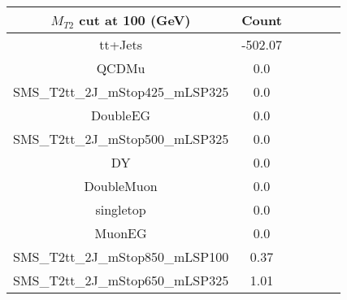 \documentclass[8pt]{article}
\begin{document}
\begin{tabular}{|c|c|c|c|c|c|}
\hline
$M_{T2}$ cut at 100 (GeV) & Count \\
\hline
\hline
tt+Jets & -502.07\\
QCDMu & 0.0\\
SMS\_T2tt\_2J\_mStop425\_mLSP325 & 0.0\\
DoubleEG & 0.0\\
SMS\_T2tt\_2J\_mStop500\_mLSP325 & 0.0\\
DY & 0.0\\
DoubleMuon & 0.0\\
singletop & 0.0\\
MuonEG & 0.0\\
SMS\_T2tt\_2J\_mStop850\_mLSP100 & 0.37\\
SMS\_T2tt\_2J\_mStop650\_mLSP325 & 1.01\\
\hline
\hline
\end{tabular}
\end{document}
